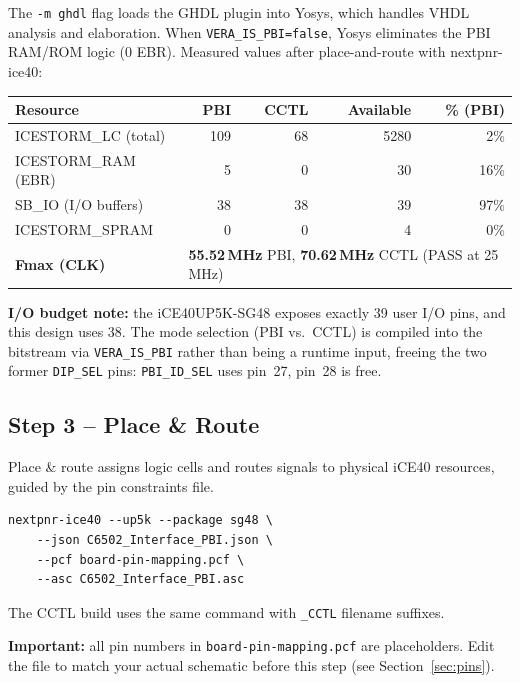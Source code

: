 \documentclass[11pt,a4paper]{article}
\newcommand{\cmd}[1]{\texttt{#1}}
\newcommand{\sig}[1]{\texttt{#1}}
\newcommand{\file}[1]{\texttt{#1}}
\begin{document}
The \cmd{-m ghdl} flag loads the GHDL plugin into Yosys, which handles
VHDL analysis and elaboration.  When \cmd{VERA\_IS\_PBI=false}, Yosys
eliminates the PBI RAM/ROM logic (0 EBR).  Measured values after place-and-route with nextpnr-ice40:

\begin{center}
\begin{tabular}{lrrrr}
\toprule
\textbf{Resource} & \textbf{PBI} & \textbf{CCTL} & \textbf{Available} & \textbf{\% (PBI)} \\
\midrule
ICESTORM\_LC (total)     & 109 & 68 & 5280 &  2\% \\
\midrule
ICESTORM\_RAM (EBR)      &   5 &  0 &   30 & 16\% \\
SB\_IO (I/O buffers)     &  38 & 38 &   39 & 97\% \\
ICESTORM\_SPRAM          &   0 &  0 &    4 &  0\% \\
\midrule
\textbf{Fmax (CLK)}      & \multicolumn{4}{l}{\textbf{55.52\,MHz} PBI, \textbf{70.62\,MHz} CCTL (PASS at 25\,MHz)} \\
\bottomrule
\end{tabular}
\end{center}

\textbf{I/O budget note:} the iCE40UP5K-SG48 exposes exactly 39 user I/O
pins, and this design uses 38.  The mode selection (PBI vs.\ CCTL)
is compiled into the bitstream via \cmd{VERA\_IS\_PBI} rather than being
a runtime input, freeing the two former \sig{DIP\_SEL} pins:
\sig{PBI\_ID\_SEL} uses pin~27, pin~28 is free.

\subsection{Step 3 -- Place \& Route}

Place \& route assigns logic cells and routes signals to physical
iCE40 resources, guided by the pin constraints file.

\begin{lstlisting}[style=shell,caption={Place \& route with nextpnr-ice40 (PBI example)}]
nextpnr-ice40 --up5k --package sg48 \
    --json C6502_Interface_PBI.json \
    --pcf board-pin-mapping.pcf \
    --asc C6502_Interface_PBI.asc
\end{lstlisting}

The CCTL build uses the same command with \file{\_CCTL} filename suffixes.

\textbf{Important:} all pin numbers in \file{board-pin-mapping.pcf} are
placeholders.  Edit the file to match your actual schematic before this
step (see Section~\ref{sec:pins}).
\end{document}
